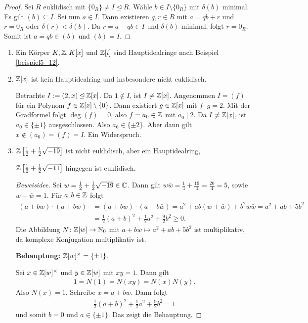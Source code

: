 \begin{proof}
	Sei $R$ euklidisch mit $\{0_R\} \neq I \unlhd R$. Wähle $b \in I \setminus \{0_R\}$ mit $\delta(b)$ minimal. Es gilt $(b) \subseteq I$. Sei nun $a \in I$. Dann existieren $q,r \in R$ mit $a = qb + r$ und $r = 0_R$ oder $\delta(r) < \delta(b)$. Da $r = a - qb \in I$ und $\delta(b)$ minimal, folgt  $r = 0_R$. Somit ist $a = qb \in (b)$ und $(b) = I$.
\end{proof}
\begin{beispiel}\label{beispiel5_15}
	\begin{enumerate}[label=(\arabic*)]
		\item Ein Körper $K, \mathbb{Z}, K[x]$ und $\mathbb{Z}[i]$ sind Hauptidealringe nach Beispiel \ref{beispiel5_12}.
		\item $\mathbb{Z}[x]$ ist kein Hauptidealring und insbesondere nicht euklidisch. 
		\begin{inlproof}
			Betrachte $I := (2,x) \unlhd \mathbb{Z}[x]$. Da $1 \notin I$, ist $I \neq \mathbb{Z}[x]$. Angenommen $I = (f)$ für ein Polynom $f \in \mathbb{Z}[x] \setminus \{0\}$. Dann existiert $g \in \mathbb{Z}[x]$ mit $f \cdot g = 2$. Mit der Gradformel folgt $\deg(f) = 0$, also $f = a_0 \in \mathbb{Z}$ mit $a_0 \mid 2$. Da $I \neq \mathbb{Z}[x]$, ist $a_0 \in \{\pm 1\}$ ausgeschlossen. Also $a_0 \in \{\pm 2\}$. Aber dann gilt $x \notin (a_0) = (f) = I$. Ein Widerspruch.
		\end{inlproof}
		\item $\mathbb{Z}\left[\frac{1}{2} + \frac{1}{2}\sqrt{-19}\right]$ ist nicht euklidisch, aber ein Hauptidealring,
		
		$\mathbb{Z}\left[\frac{1}{2} + \frac{1}{2}\sqrt{-11}\right]$ hingegen ist euklidisch.
		\begin{proof}[Beweisidee]
			Sei $w = \frac{1}{2} + \frac{1}{2}\sqrt{-19} \in \mathbb{C}$. Dann gilt $w \bar{w} = \frac{1}{4} + \frac{19}{4} = \frac{20}{4} = 5$, sowie $w + \bar{w} = 1$. Für $a,b \in \mathbb{Z}$ folgt
			\begin{align*}
				(a+bw) \cdot \overline{(a+bw)} &= (a+bw)\cdot(a+b\bar{w}) = a^2 + ab(w+\bar{w}) + b^2 w\bar{w} = a^2 + ab + 5b^2\\
				&= \frac{1}{2}(a+b)^2 + \frac{1}{2}a^2 + \frac{9}{2} b^2 \geq 0.
			\end{align*}
			Die Abbildung $N \colon \mathbb{Z}[w] \to \mathbb{N}_0$ mit $a + bw \mapsto a^2 + ab + 5b^2$ ist multiplikativ, da komplexe Konjugation multiplikativ ist. 
			
			\textbf{Behauptung: } $\mathbb{Z}[w]^\times = \{\pm 1\}$. 
			
			Sei $x \in \mathbb{Z}[w]^\times$ und $y \in \mathbb{Z}[w]$ mit $xy = 1$. Dann gilt
			\begin{align*}
				1 = N(1) = N(xy) = N(x)N(y).
			\end{align*}
			Also $N(x)= 1$. Schreibe $x = a + bw$. Dann folgt
			\begin{align*}
				\frac{1}{2}(a+b)^2 + \frac{1}{2}a^2+ \frac{9}{2}b^2 = 1
			\end{align*}
			und somit $b = 0$ und $a \in \{\pm 1\}$. Das zeigt die Behauptung. 
			

\end{proof}
\end{enumerate}
\end{beispiel}
